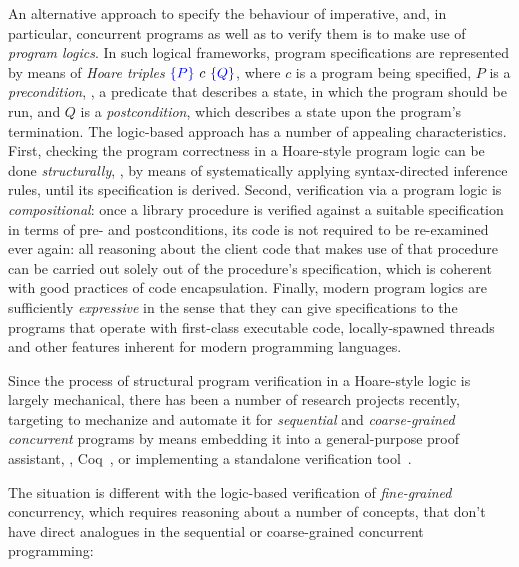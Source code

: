 \documentclass[blockstyle,preprint,nocopyrightspace]{sigplanconf}
\begin{document}
An alternative approach to specify the behaviour of imperative, and,
in particular, concurrent programs as well as to verify them is to
make use of \emph{program logics}. In such logical frameworks, program
specifications are represented by means of \emph{Hoare triples}
$\textcolor{blue}{\left\{{P}\right\}}~c~\textcolor{blue}{\left\{{Q}\right\}}$, where $c$ is a program being specified, $P$ is
a \emph{precondition}, \ie, a predicate that describes a state, in
which the program should be run, and $Q$ is a \emph{postcondition},
which describes a state upon the program's termination.
%
The logic-based approach has a number of appealing characteristics.
First, checking the program correctness in a Hoare-style program logic
can be done \emph{structurally}, \ie, by means of systematically
applying syntax-directed inference rules, until its specification is
derived.
%
Second, verification via a program logic is \emph{compositional}: once
a library procedure is verified against a suitable specification in
terms of pre- and postconditions, its code is not required to be
re-examined ever again: all reasoning about the client code that makes
use of that procedure can be carried out solely out of the procedure's
specification, which is coherent with good practices of code
encapsulation.
%
Finally, modern program logics are sufficiently \emph{expressive} in
the sense that they can give specifications to the programs that
operate with first-class executable code, locally-spawned threads and
other features inherent for modern programming languages.

Since the process of structural program verification in a Hoare-style
logic is largely mechanical, there has been a number of research
projects recently, targeting to mechanize and automate it for
\emph{sequential} and \emph{coarse-grained concurrent} programs by
means embedding it into a general-purpose proof assistant, \eg,
Coq~\cite{Chlipala:PLDI11,Nanevski-al:POPL10}, or implementing a
standalone verification tool~\cite{Jacobs-al:NFM11}.

The situation is different with the logic-based verification of
\emph{fine-grained} concurrency, which requires reasoning about a
number of concepts, that don't have direct analogues in the sequential
or coarse-grained concurrent programming:
\end{document}
